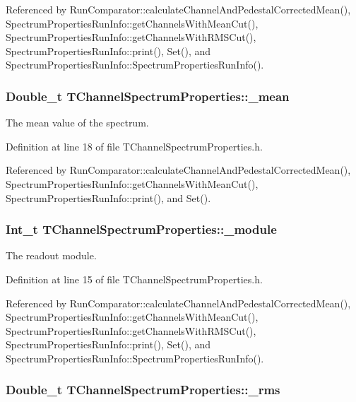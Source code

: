 Referenced by RunComparator::calculateChannelAndPedestalCorrectedMean(), SpectrumPropertiesRunInfo::getChannelsWithMeanCut(), SpectrumPropertiesRunInfo::getChannelsWithRMSCut(), SpectrumPropertiesRunInfo::print(), Set(), and SpectrumPropertiesRunInfo::SpectrumPropertiesRunInfo().\hypertarget{class_t_channel_spectrum_properties_a480a137b650eda8d36fb633de95259d1}{
\subsubsection[{\_\-mean}]{\setlength{\rightskip}{0pt plus 5cm}Double\_\-t {\bf TChannelSpectrumProperties::\_\-mean}}}
\label{class_t_channel_spectrum_properties_a480a137b650eda8d36fb633de95259d1}


The mean value of the spectrum. 

Definition at line 18 of file TChannelSpectrumProperties.h.

Referenced by RunComparator::calculateChannelAndPedestalCorrectedMean(), SpectrumPropertiesRunInfo::getChannelsWithMeanCut(), SpectrumPropertiesRunInfo::print(), and Set().\hypertarget{class_t_channel_spectrum_properties_ae3cf44950a58087f83b1660648750619}{
\subsubsection[{\_\-module}]{\setlength{\rightskip}{0pt plus 5cm}Int\_\-t {\bf TChannelSpectrumProperties::\_\-module}}}
\label{class_t_channel_spectrum_properties_ae3cf44950a58087f83b1660648750619}


The readout module. 

Definition at line 15 of file TChannelSpectrumProperties.h.

Referenced by RunComparator::calculateChannelAndPedestalCorrectedMean(), SpectrumPropertiesRunInfo::getChannelsWithMeanCut(), SpectrumPropertiesRunInfo::getChannelsWithRMSCut(), SpectrumPropertiesRunInfo::print(), Set(), and SpectrumPropertiesRunInfo::SpectrumPropertiesRunInfo().\hypertarget{class_t_channel_spectrum_properties_a1eb2a743128d8069e0e962dfaaff3367}{
\subsubsection[{\_\-rms}]{\setlength{\rightskip}{0pt plus 5cm}Double\_\-t {\bf TChannelSpectrumProperties::\_\-rms}}}
\label{class_t_channel_spectrum_properties_a1eb2a743128d8069e0e962dfaaff3367}


